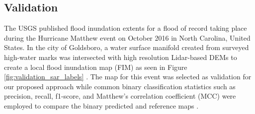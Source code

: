 \documentclass{article}
\begin{document}
\subsection{Validation}
\label{ssec:validation}
%
The USGS published flood inundation extents for a flood of record taking place during the Hurricane Matthew event on October 2016 in North Carolina, United States. 
In the city of Goldsboro, a water surface manifold created from surveyed high-water marks was intersected with high resolution Lidar-based DEMs to create a local flood inundation map (FIM) as seen in Figure \ref{fig:validation_sar_labels} \cite{musser2017characterization}.
The map for this event was selected as validation for our proposed approach while common binary classification statistics such as precision, recall, f1-score, and Matthew's correlation coefficient (MCC) were employed to compare the binary predicted and reference maps \cite{canbek2017binary,chicco2020advantages,matthews1975comparison,baldi2000assessing}.
%
\end{document}
